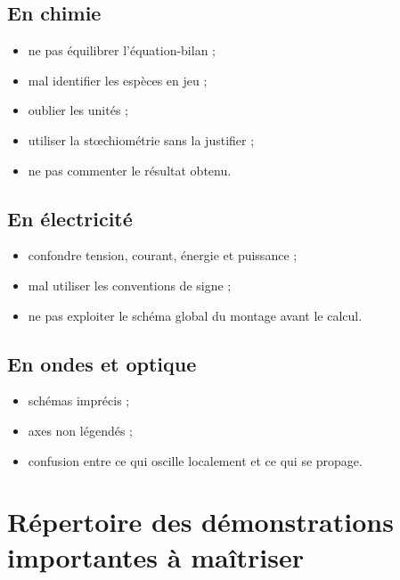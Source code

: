 \documentclass[11pt,a4paper]{article}
\begin{document}
\subsection{En chimie}
\begin{itemize}
    \item ne pas équilibrer l'équation-bilan ;
    \item mal identifier les espèces en jeu ;
    \item oublier les unités ;
    \item utiliser la stœchiométrie sans la justifier ;
    \item ne pas commenter le résultat obtenu.
\end{itemize}

\subsection{En électricité}
\begin{itemize}
    \item confondre tension, courant, énergie et puissance ;
    \item mal utiliser les conventions de signe ;
    \item ne pas exploiter le schéma global du montage avant le calcul.
\end{itemize}

\subsection{En ondes et optique}
\begin{itemize}
    \item schémas imprécis ;
    \item axes non légendés ;
    \item confusion entre ce qui oscille localement et ce qui se propage.
\end{itemize}

\section{Répertoire des démonstrations importantes à maîtriser}
\end{document}
